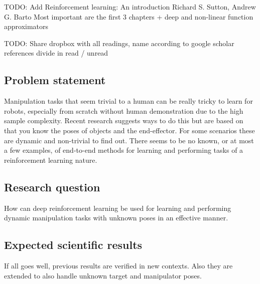 TODO: Add Reinforcement learning: An introduction
Richard S. Sutton, Andrew G. Barto
Most important are the first 3 chapters + deep and non-linear function approximators

TODO: Share dropbox with all readings, name according to google scholar references
divide in read / unread


\subsection{Problem statement}

Manipulation tasks that seem trivial to a human can be really tricky to learn
for robots, especially from scratch without human demonstration due to the high
sample complexity. Recent research suggests ways to do this but are based on
that you know the poses of objects and the end-effector. For some scenarios
these are dynamic and non-trivial to find out. There seems to be no known, or
at most a few examples, of end-to-end methods for learning and performing tasks
of a reinforcement learning nature.

\subsection{Research question}

How can deep reinforcement learning be used for learning and performing dynamic
manipulation tasks with unknown poses in an effective manner.

\subsection{Expected scientific results}
If all goes well, previous results are verified in new contexts. Also
they are extended to also handle unknown target and manipulator poses.
